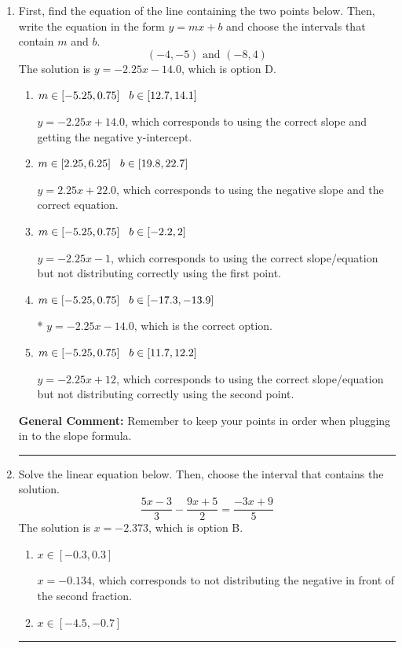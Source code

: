 \documentclass{extbook}[14pt]
\newcommand{\litem}[1]{\item #1

\rule{\textwidth}{0.4pt}}
\begin{document}
\begin{enumerate}\litem{
First, find the equation of the line containing the two points below. Then, write the equation in the form $ y=mx+b $ and choose the intervals that contain $m$ and $b$.
\[ (-4, -5) \text{ and } (-8, 4) \]The solution is \( y = -2.25x -14.0 \), which is option D.\begin{enumerate}[label=\Alph*.]
\item \( m \in [-5.25, 0.75] \hspace*{3mm} b \in [12.7, 14.1] \)

 $y = -2.25x + 14.0$, which corresponds to using the correct slope and getting the negative y-intercept.
\item \( m \in [2.25, 6.25] \hspace*{3mm} b \in [19.8, 22.7] \)

 $y = 2.25x + 22.0$, which corresponds to using the negative slope and the correct equation.
\item \( m \in [-5.25, 0.75] \hspace*{3mm} b \in [-2.2, 2] \)

 $y = -2.25x -1$, which corresponds to using the correct slope/equation but not distributing correctly using the first point.
\item \( m \in [-5.25, 0.75] \hspace*{3mm} b \in [-17.3, -13.9] \)

* $y = -2.25x -14.0$, which is the correct option.
\item \( m \in [-5.25, 0.75] \hspace*{3mm} b \in [11.7, 12.2] \)

 $y = -2.25x + 12$, which corresponds to using the correct slope/equation but not distributing correctly using the second point.
\end{enumerate}

\textbf{General Comment:} Remember to keep your points in order when plugging in to the slope formula.
}
\litem{
Solve the linear equation below. Then, choose the interval that contains the solution.
\[ \frac{5x -3}{3} - \frac{9x + 5}{2} = \frac{-3x + 9}{5} \]The solution is \( x = -2.373 \), which is option B.\begin{enumerate}[label=\Alph*.]
\item \( x \in [-0.3, 0.3] \)

 $x = -0.134$, which corresponds to not distributing the negative in front of the second fraction.
\item \( x \in [-4.5, -0.7] \)


\end{enumerate}}
\end{enumerate}
\end{document}
